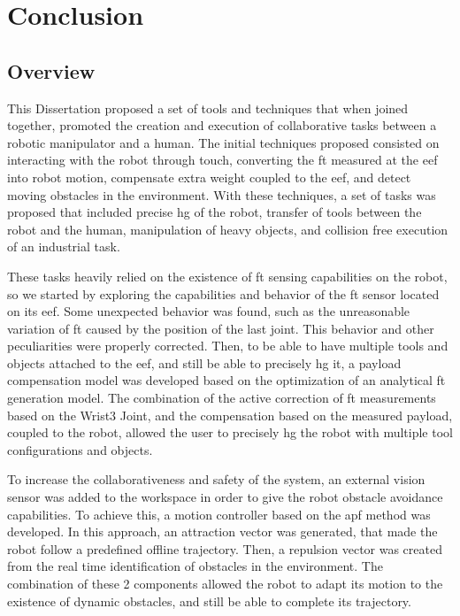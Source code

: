 \chapter{Conclusion}





\section{Overview}
\par This Dissertation proposed a set of tools and techniques that when joined together, promoted the creation and execution of collaborative tasks between a robotic manipulator and a human. The initial techniques proposed consisted on interacting with the robot through touch, converting the \ac{ft} measured at the \ac{eef} into robot motion, compensate extra weight coupled to the \ac{eef}, and detect moving obstacles in the environment. With these techniques, a set of tasks was proposed that included precise \ac{hg} of the robot, transfer of tools between the robot and the human, manipulation of heavy objects, and collision free execution of an industrial task.

\par These tasks  heavily relied on the existence of \ac{ft} sensing capabilities on the robot, so we started by exploring the capabilities and behavior of the \ac{ft} sensor located on its \ac{eef}. Some unexpected behavior was found, such as the unreasonable variation of \ac{ft} caused by the position of the last joint. This behavior and other peculiarities were properly corrected. Then, to be able to have multiple tools and objects attached to the \ac{eef}, and still be able to precisely \ac{hg} it, a payload compensation model was developed based on the optimization of an analytical \ac{ft} generation model. The combination of the active correction of \ac{ft} measurements based on the Wrist3 Joint, and the compensation based on the measured payload, coupled to the robot, allowed the user to precisely \ac{hg} the robot with multiple tool configurations and objects.

\par To increase the collaborativeness and safety of the system, an external vision sensor was added to the workspace in order to give the robot obstacle avoidance capabilities. To achieve this, a motion controller based on the \ac{apf} method was developed. In this approach, an attraction vector was generated, that made the robot follow a predefined offline trajectory. Then, a repulsion vector was created from the real time identification of obstacles in the environment. The combination of these 2 components allowed the robot to adapt its motion to the existence of dynamic obstacles, and still be able to complete its trajectory.

